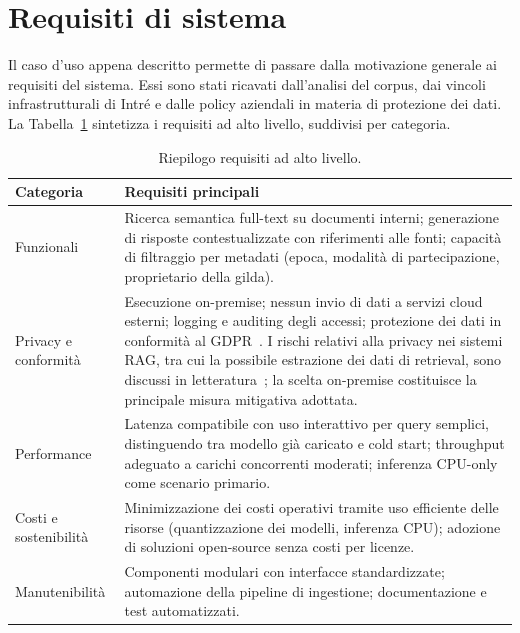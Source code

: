 \section{Requisiti di sistema}
\label{sec:system_requirements}

Il caso d'uso appena descritto permette di passare dalla motivazione generale ai
requisiti del sistema. Essi sono stati ricavati dall'analisi del corpus, dai
vincoli infrastrutturali di Intré e dalle policy aziendali in materia di
protezione dei dati. La Tabella~\ref{tab:req_summary} sintetizza i requisiti ad
alto livello, suddivisi per categoria.

\begin{table}[ht]
  \centering
  \caption{Riepilogo requisiti ad alto livello.}
  \label{tab:req_summary}
  \small
  \begin{tabular}{p{3.5cm}p{9.5cm}}
    \toprule
    \textbf{Categoria} & \textbf{Requisiti principali} \\
    \midrule
    Funzionali & Ricerca semantica full-text su documenti interni; generazione
      di risposte contestualizzate con riferimenti alle fonti; capacità di
      filtraggio per metadati (epoca, modalità di partecipazione, proprietario
      della gilda). \\
    \addlinespace
    Privacy e conformità & Esecuzione on-premise; nessun invio di dati a
      servizi cloud esterni; logging e auditing degli accessi; protezione dei
      dati in conformità al GDPR~\cite{gdpr2016}. I rischi relativi alla
      privacy nei sistemi RAG, tra cui la possibile estrazione dei dati di
      retrieval, sono discussi in letteratura~\cite{zeng2024privacy}; la
      scelta on-premise costituisce la principale misura mitigativa adottata. \\
    \addlinespace
    Performance & Latenza compatibile con uso interattivo per query semplici,
      distinguendo tra modello già caricato e cold start; throughput adeguato a
      carichi concorrenti moderati; inferenza CPU-only come scenario primario. \\
    \addlinespace
    Costi e sostenibilità & Minimizzazione dei costi operativi tramite uso
      efficiente delle risorse (quantizzazione dei modelli, inferenza CPU);
      adozione di soluzioni open-source senza costi per licenze. \\
    \addlinespace
    Manutenibilità & Componenti modulari con interfacce standardizzate;
      automazione della pipeline di ingestione; documentazione e test
      automatizzati. \\
    \bottomrule
  \end{tabular}
\end{table}

